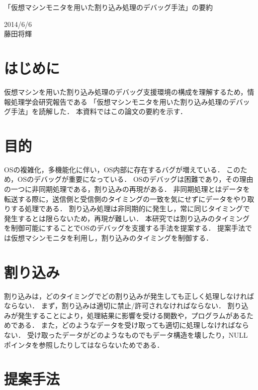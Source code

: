 \documentclass[12pt]{jsarticle}
\begin{document}

\begin{center}
{\LARGE 「仮想マシンモニタを用いた割り込み処理のデバッグ手法」の要約}
\end{center}

\begin{flushright}
  2014/6/6\\
  藤田将輝
\end{flushright}
\section{はじめに}
仮想マシンを用いた割り込み処理のデバッグ支援環境の構成を理解するため，情報処理学会研究報告である
「仮想マシンモニタを用いた割り込み処理のデバッグ手法」\cite{doc1}を読解した．
本資料ではこの論文の要約を示す．

\section{目的}
OSの複雑化，多機能化に伴い，OS内部に存在するバグが増えている．
このため，OSのデバッグが重要になっている．
OSのデバッグは困難であり，その理由の一つに非同期処理である，割り込みの再現がある．
非同期処理とはデータを転送する際に，送信側と受信側のタイミングの一致を気にせずにデータをやり取りする処理である．
割り込み処理は非同期的に発生し，常に同じタイミングで発生するとは限らないため，再現が難しい．
本研究では割り込みのタイミングを制御可能にすることでOSのデバッグを支援する手法を提案する．
提案手法では仮想マシンモニタを利用し，割り込みのタイミングを制御する．
\section{割り込み}
割り込みは，どのタイミングでどの割り込みが発生しても正しく処理しなければならない．
まず，割り込みは適切に禁止/許可されなければならない．
割り込みが発生することにより，処理結果に影響を受ける関数や，プログラムがあるためである．
また，どのようなデータを受け取っても適切に処理しなければならない．
受け取ったデータがどのようなものでもデータ構造を壊したり，NULLポインタを参照したりしてはならないためである．

\section{提案手法}
\end{document}
